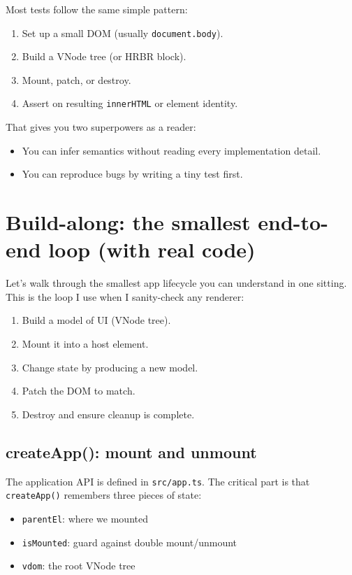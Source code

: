 Most tests follow the same simple pattern:

\begin{enumerate}
  \item Set up a small DOM (usually \texttt{document.body}).
  \item Build a VNode tree (or HRBR block).
  \item Mount, patch, or destroy.
  \item Assert on resulting \texttt{innerHTML} or element identity.
\end{enumerate}

That gives you two superpowers as a reader:

\begin{itemize}
  \item You can infer semantics without reading every implementation detail.
  \item You can reproduce bugs by writing a tiny test first.
\end{itemize}

\section{Build-along: the smallest end-to-end loop (with real code)}
Let's walk through the smallest app lifecycle you can understand in one sitting.
This is the loop I use when I sanity-check any renderer:

\begin{enumerate}
  \item Build a model of UI (VNode tree).
  \item Mount it into a host element.
  \item Change state by producing a new model.
  \item Patch the DOM to match.
  \item Destroy and ensure cleanup is complete.
\end{enumerate}

\subsection{createApp(): mount and unmount}
The application API is defined in \texttt{src/app.ts}.
The critical part is that \texttt{createApp()} remembers three pieces of state:

\begin{itemize}
  \item \texttt{parentEl}: where we mounted
  \item \texttt{isMounted}: guard against double mount/unmount
  \item \texttt{vdom}: the root VNode tree
\end{itemize}

